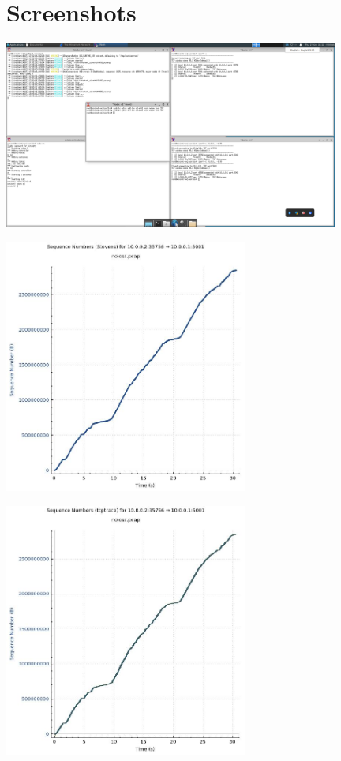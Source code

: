 \documentclass{article}
\begin{document}
    \section*{Screenshots}

    \includegraphics[width=11cm]{screenshot}

    \includegraphics[width=8cm]{nolossstevens}
    
    \includegraphics[width=8cm]{nolosstcptrace}
\end{document}
